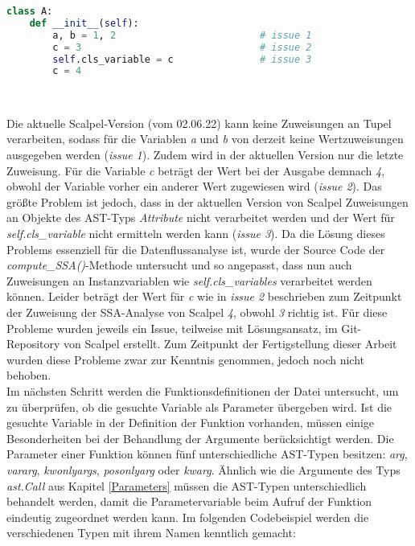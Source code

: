 \documentclass[german,bachelor]{swsLeipzig}
\begin{document}
\noindent\begin{minipage}{\linewidth}
\begin{lstlisting}[language=Python, frame=single, basicstyle=\small, label=scalpel_limits, caption={Limitierungen der Datenflussanalyse},captionpos=b]
class A:
    def __init__(self):
        a, b = 1, 2                         # issue 1
        c = 3                               # issue 2
        self.cls_variable = c               # issue 3
        c = 4
\end{lstlisting}
\end{minipage}
\

\noindent Die aktuelle Scalpel-Version (vom 02.06.22) kann keine Zuweisungen an Tupel verarbeiten, sodass für die Variablen \textit{a} und \textit{b}
von derzeit keine Wertzuweisungen ausgegeben werden (\textit{issue 1}).
Zudem wird in der aktuellen Version nur die letzte Zuweisung.
Für die Variable \textit{c} beträgt der Wert bei der Ausgabe demnach \textit{4}, obwohl der Variable vorher ein anderer
Wert zugewiesen wird (\textit{issue 2}).
Das größte Problem ist jedoch, dass in der aktuellen Version von Scalpel Zuweisungen an Objekte des AST-Typs \textit{Attribute} nicht verarbeitet werden
und der Wert für \textit{self.cls\_variable} nicht ermitteln werden kann (\textit{issue 3}).
Da die Lösung dieses Problems essenziell für die Datenflussanalyse ist, wurde der Source Code der \textit{compute\_SSA()}-Methode
untersucht und so angepasst, dass nun auch Zuweisungen an Instanzvariablen wie \textit{self.cls\_variables} verarbeitet werden können.
Leider beträgt der Wert für \textit{c} wie in \textit{issue 2} beschrieben zum Zeitpunkt der Zuweisung der SSA-Analyse von Scalpel \textit{4}, obwohl
\textit{3} richtig ist.
Für diese Probleme wurden jeweils ein Issue, teilweise mit Lösungsansatz, im Git-Repository von Scalpel erstellt.
Zum Zeitpunkt der Fertigstellung dieser Arbeit wurden diese Probleme zwar zur Kenntnis genommen, jedoch noch nicht behoben.\\

\noindent Im nächsten Schritt werden die Funktionsdefinitionen der Datei untersucht, um zu überprüfen, ob die gesuchte Variable als
Parameter übergeben wird.
Ist die gesuchte Variable in der Definition der Funktion vorhanden, müssen einige Besonderheiten bei der Behandlung der Argumente
berücksichtigt werden.
Die Parameter einer Funktion können fünf unterschiedliche AST-Typen besitzen: \textit{arg}, \textit{vararg}, \textit{kwonlyargs},
\textit{posonlyarg} oder \textit{kwarg}.
Ähnlich wie die Argumente des Typs \textit{ast.Call} aus Kapitel \ref{Parameters} müssen die AST-Typen unterschiedlich behandelt werden, damit die Parametervariable
beim Aufruf der Funktion eindeutig zugeordnet werden kann.
Im folgenden Codebeispiel werden die verschiedenen Typen mit ihrem Namen kenntlich gemacht: \\
\end{document}
